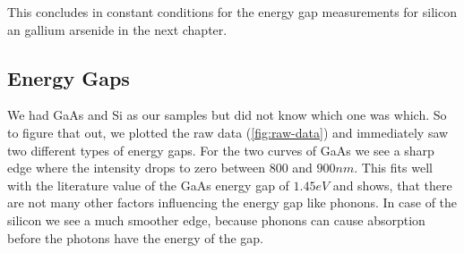 \documentclass[]{article}
\begin{document}
This concludes in constant conditions for the energy gap measurements for silicon an gallium arsenide in the next chapter.

\subsection{Energy Gaps}
We had GaAs and Si as our samples but did not know which one was which. So to figure that out, we plotted the raw data (\ref{fig:raw-data}) and immediately saw two different types of energy gaps. For the two curves of GaAs we see a sharp edge where the intensity drops to zero between $800$ and $900nm$. This fits well with the literature value of the GaAs energy gap of $1.45eV$ and shows, that there are not many other factors influencing the energy gap like phonons. In case of the silicon we see a much smoother edge, because phonons can cause absorption before the photons have the energy of the gap.
\end{document}

